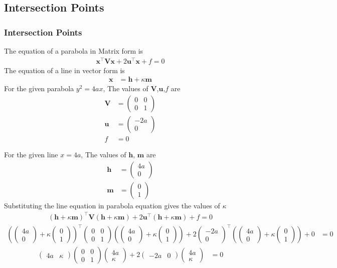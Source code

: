 \documentclass{beamer}
\providecommand{\brak}[1]{\ensuremath{\left(#1\right)}}
\theoremstyle{remark}
\newcommand{\myvec}[1]{\ensuremath{\begin{pmatrix}#1\end{pmatrix}}}
\let\vec\mathbf
\numberwithin{equation}{section}
\begin{document}
\subsection{Intersection Points}
\begin{frame}
\frametitle{Intersection Points}
The equation of a parabola in Matrix form is
\begin{align}
\vec{x}^\top\vec{V}\vec{x} + 2\vec{u}^\top\vec{x} + f = 0
\end{align}
The equation of a line in vector form is
\begin{align}
\vec{x}&=\vec{h}+\kappa\vec{m}
\end{align}
For the given parabola $y^2=4ax$, The values of $\vec{V}$,$\vec{u}$,$f$ are
\begin{align}
\vec{V}&=\myvec{0 & 0\\0 & 1}\\
\vec{u}&=\myvec{-2a\\0}\\
f&=0
\end{align}
\end{frame}
\begin{frame}
    For the given line $x=4a$, The values of $\vec{h}$, $\vec{m}$ are
\begin{align}
\vec{h}&=\myvec{4a\\0}\\
\vec{m}&=\myvec{0\\1} 
\end{align}
Substituting the line equation in parabola equation gives the values of $\kappa$
\begin{align}
    \brak{\vec{h}+\kappa\vec{m}}^\top\vec{V}\brak{\vec{h}+\kappa\vec{m}} + 2\vec{u}^\top\brak{\vec{h}+\kappa\vec{m}} + f = 0 
\end{align}
{\scriptsize
\begin{align}
\brak{\myvec{4a\\0}+\kappa\myvec{0\\1}}^\top\myvec{0 & 0\\0 & 1}\brak{\myvec{4a\\0}+\kappa\myvec{0\\1}} + 2\myvec{-2a\\0}^\top\brak{\myvec{4a\\0}+\kappa\myvec{0\\1}} + 0 &= 0 
\end{align}}
\begin{align}
    \myvec{4a&\kappa}\myvec{0&0\\0&1}\myvec{4a\\\kappa}+2\myvec{-2a&0}\myvec{4a\\\kappa} &= 0
\end{align}
\end{frame}
\end{document}
